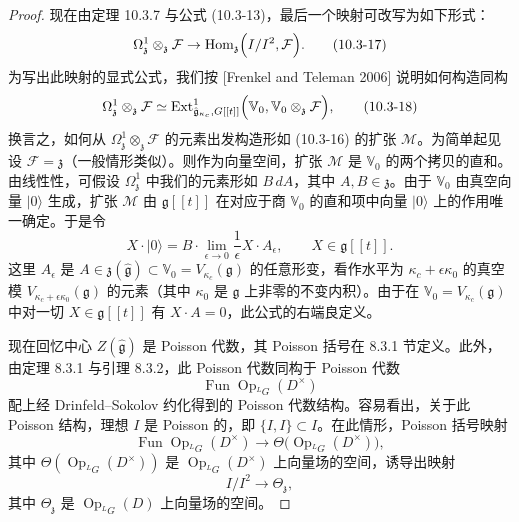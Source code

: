 \begin{proof}
    现在由定理 10.3.7 与公式 (10.3-13)，最后一个映射可改写为如下形式：
    \begin{equation}
        \Omega^1_{\mathfrak{z}}\otimes_{\mathfrak{z}}\mathcal{F}
        \to\operatorname{Hom}_{\mathfrak{z}}\Bigl(I/I^2,\mathcal{F}\Bigr).
        \tag{10.3-17}
    \end{equation}
    为写出此映射的显式公式，我们按 [Frenkel and Teleman 2006] 说明如何构造同构
    \begin{equation}
        \Omega^1_{\mathfrak{z}}\otimes_{\mathfrak{z}}\mathcal{F}
        \simeq\operatorname{Ext}^1_{\hat{\mathfrak{g}}_{\kappa_c},G[[t]]}
        \Bigl(\mathbb{V}_0,\mathbb{V}_0\otimes_{\mathfrak{z}}\mathcal{F}\Bigr),
        \tag{10.3-18}
    \end{equation}
    换言之，如何从 $\Omega^1_{\mathfrak{z}}\otimes_{\mathfrak{z}}\mathcal{F}$ 的元素出发构造形如 (10.3-16) 的扩张 $\mathcal{M}$。为简单起见设 $\mathcal{F}=\mathfrak{z}$（一般情形类似）。则作为向量空间，扩张 $\mathcal{M}$ 是 $\mathbb{V}_0$ 的两个拷贝的直和。由线性性，可假设 $\Omega^1_{\mathfrak{z}}$ 中我们的元素形如 $B\,dA$，其中 $A,B\in\mathfrak{z}$。由于 $\mathbb{V}_0$ 由真空向量 $|0\rangle$ 生成，扩张 $\mathcal{M}$ 由 $\mathfrak{g}[[t]]$ 在对应于商 $\mathbb{V}_0$ 的直和项中向量 $|0\rangle$ 上的作用唯一确定。于是令
    \[
        X\cdot|0\rangle=B\cdot\lim_{\epsilon\to0}\frac{1}{\epsilon}X\cdot A_\epsilon,
        \qquad X\in\mathfrak{g}[[t]].
    \]
    这里 $A_\epsilon$ 是 $A\in\mathfrak{z}(\hat{\mathfrak{g}})\subset\mathbb{V}_0=V_{\kappa_c}(\mathfrak{g})$ 的任意形变，看作水平为 $\kappa_c+\epsilon\kappa_0$ 的真空模 $V_{\kappa_c+\epsilon\kappa_0}(\mathfrak{g})$ 的元素（其中 $\kappa_0$ 是 $\mathfrak{g}$ 上非零的不变内积）。由于在 $\mathbb{V}_0=V_{\kappa_c}(\mathfrak{g})$ 中对一切 $X\in\mathfrak{g}[[t]]$ 有 $X\cdot A=0$，此公式的右端良定义。

    现在回忆中心 $Z(\hat{\mathfrak{g}})$ 是 Poisson 代数，其 Poisson 括号在 8.3.1 节定义。此外，由定理 8.3.1 与引理 8.3.2，此 Poisson 代数同构于 Poisson 代数
    \[
        \operatorname{Fun}\operatorname{Op}_{{}^LG}(D^\times)
    \]
    配上经 Drinfeld--Sokolov 约化得到的 Poisson 代数结构。容易看出，关于此 Poisson 结构，理想 $I$ 是 Poisson 的，即 $\{I,I\}\subset I$。在此情形，Poisson 括号映射
    \[
        \operatorname{Fun}\operatorname{Op}_{{}^LG}(D^\times)
        \to\Theta\bigl(\operatorname{Op}_{{}^LG}(D^\times)\bigr),
    \]
    其中 $\Theta(\operatorname{Op}_{{}^LG}(D^\times))$ 是 $\operatorname{Op}_{{}^LG}(D^\times)$ 上向量场的空间，诱导出映射
    \begin{equation}
        I/I^2\to\Theta_{\mathfrak{z}},
        \tag{10.3-19}
    \end{equation}
    其中 $\Theta_{\mathfrak{z}}$ 是 $\operatorname{Op}_{{}^LG}(D)$ 上向量场的空间。


\end{proof}
